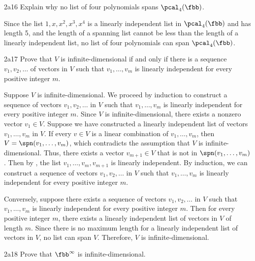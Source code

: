 \begin{exercise}{2a16}
    Explain why no list of four polynomials spans $\pcal_4(\fbb)$.
\end{exercise}

\begin{sol}
    Since the list $1, x, x^2, x^3, x^4$ is a linearly independent list in $\pcal_4(\fbb)$ and has length 5, and the length of a spanning list cannot be less than the length of a linearly independent list, no list of four polynomials can span $\pcal_4(\fbb)$.
\end{sol}
 
\begin{exercise}{2a17}
    Prove that $V$ is infinite-dimensional if and only if there is a sequence $v_1, v_2, \ldots$ of vectors in $V$ such that $v_1, \ldots, v_m$ is linearly independent for every positive integer $m$.
\end{exercise}

\begin{sol}
    Suppose $V$ is infinite-dimensional.
	We proceed by induction to construct a sequence of vectors $v_1, v_2, \ldots$ in $V$ such that $v_1, \ldots, v_m$ is linearly independent for every positive integer $m$.
	Since $V$ is infinite-dimensional, there exists a nonzero vector $v_1 \in V$.
	Suppose we have constructed a linearly independent list of vectors $v_1, \ldots, v_m$ in $V$.
	If every $v \in V$ is a linear combination of $v_1, \ldots, v_m$, then $V = \spn(v_1, \ldots, v_m)$, which contradicts the assumption that $V$ is infinite-dimensional.
	Thus, there exists a vector $v_{m+1} \in V$ that is not in $\spn(v_1, \ldots, v_m)$.
	Then by , the list $v_1, \ldots, v_m, v_{m+1}$ is linearly independent.
	By induction, we can construct a sequence of vectors $v_1, v_2, \ldots$ in $V$ such that $v_1, \ldots, v_m$ is linearly independent for every positive integer $m$.

    Conversely, suppose there exists a sequence of vectors $v_1, v_2, \ldots$ in $V$ such that $v_1, \ldots, v_m$ is linearly independent for every positive integer $m$.
	Then for every positive integer $m$, there exists a linearly independent list of vectors in $V$ of length $m$.
	Since there is no maximum length for a linearly independent list of vectors in $V$, no list can span $V$.
    Therefore, $V$ is infinite-dimensional.
\end{sol}
 
\begin{exercise}{2a18}
    Prove that $\fbb^\infty$ is infinite-dimensional.
\end{exercise}

